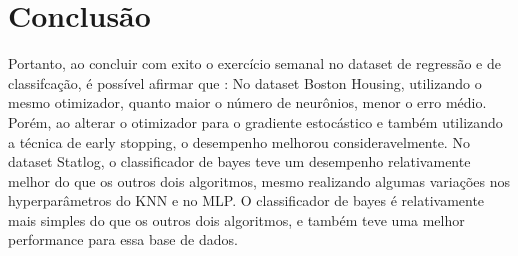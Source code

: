 \documentclass{article}
\begin{document}
\vspace{10pt}

\section{Conclusão}

\vspace{10pt}

Portanto, ao concluir com exito o exercício semanal no dataset de regressão e de classifcação, é possível afirmar que : No dataset Boston Housing, utilizando o mesmo otimizador, quanto maior o número de neurônios, menor o erro médio. Porém, ao alterar o otimizador para o gradiente estocástico e também utilizando a técnica de early stopping, o desempenho melhorou consideravelmente. No dataset Statlog, o classificador de bayes teve um desempenho relativamente melhor do que os outros dois algoritmos, mesmo realizando algumas variações nos hyperparâmetros do KNN e no MLP. O classificador de bayes é relativamente mais simples do que os outros dois algoritmos, e também teve uma melhor performance para essa base de dados.
\end{document}
